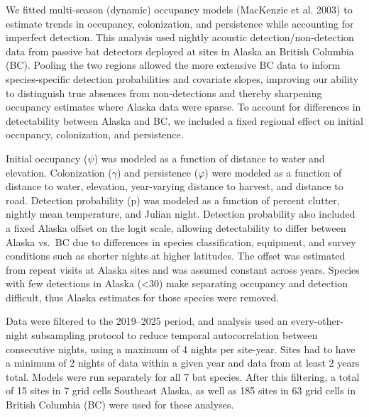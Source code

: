 \documentclass[
  letterpaper,
  DIV=11,
  numbers=noendperiod]{scrartcl}
\begin{document}
We fitted multi-season (dynamic) occupancy models (MacKenzie et al.
2003) to estimate trends in occupancy, colonization, and persistence
while accounting for imperfect detection. This analysis used nightly
acoustic detection/non-detection data from passive bat detectors
deployed at sites in Alaska an British Columbia (BC). Pooling the two
regions allowed the more extensive BC data to inform species-specific
detection probabilities and covariate slopes, improving our ability to
distinguish true absences from non-detections and thereby sharpening
occupancy estimates where Alaska data were sparse. To account for
differences in detectability between Alaska and BC, we included a fixed
regional effect on initial occupancy, colonization, and persistence.

Initial occupancy (\(\psi\)) was modeled as a function of distance to
water and elevation. Colonization (\(\gamma\)) and persistence
(\(\varphi\)) were modeled as a function of distance to water,
elevation, year-varying distance to harvest, and distance to road.
Detection probability (p) was modeled as a function of percent clutter,
nightly mean temperature, and Julian night. Detection probability also
included a fixed Alaska offset on the logit scale, allowing
detectability to differ between Alaska vs.~BC due to differences in
species classification, equipment, and survey conditions such as shorter
nights at higher latitudes. The offset was estimated from repeat visits
at Alaska sites and was assumed constant across years. Species with few
detections in Alaska (\textless30) make separating occupancy and
detection difficult, thus Alaska estimates for those species were
removed.~

Data were filtered to the 2019--2025 period, and analysis used an
every-other-night subsampling protocol to reduce temporal
autocorrelation between consecutive nights, using a maximum of 4 nights
per site-year. Sites had to have a minimum of 2 nights of data within a
given year and data from at least 2 years total. Models were run
separately for all 7 bat species. After this filtering, a total of 15
sites in 7 grid cells Southeast Alaska, as well as 185 sites in 63 grid
cells in British Columbia (BC) were used for these analyses.
\end{document}
